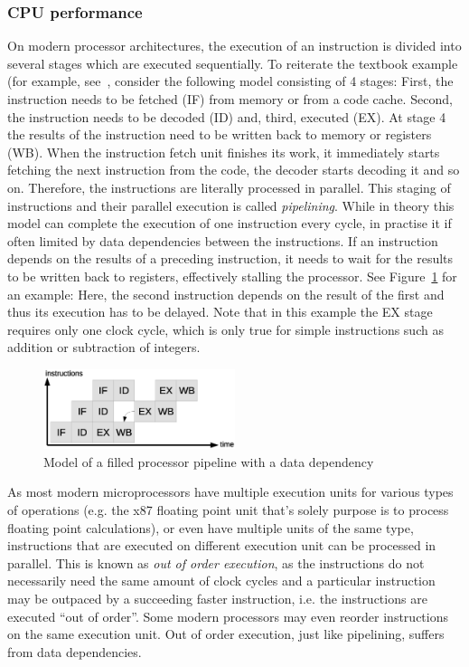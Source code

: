 \subsubsection{CPU performance}
On modern processor architectures, the execution of an instruction is divided into several stages which are executed sequentially. To reiterate the textbook example (for example, see~\cite[p. 411]{murdocca1999computer}, consider the following model consisting of 4 stages: First, the instruction needs to be fetched (IF) from memory or from a code cache. Second, the instruction needs to be decoded (ID) and, third, executed (EX). At stage 4 the results of the instruction need to be written back to memory or registers (WB). When the instruction fetch unit finishes its work, it immediately starts fetching the next instruction from the code, the decoder starts decoding it and so on. Therefore, the instructions are literally processed in parallel. This staging of instructions and their parallel execution is called \emph{pipelining}. While in theory this model can complete the execution of one instruction every cycle, in practise it if often limited by data dependencies between the instructions. If an instruction depends on the results of a preceding instruction, it needs to wait for the results to be written back to registers, effectively stalling the processor. See Figure~\ref{fig:pipeline} for an example: Here, the second instruction depends on the result of the first and thus its execution has to be delayed. Note that in this example the EX stage requires only one clock cycle, which is only true for simple instructions such as addition or subtraction of integers.

\begin{figure}[h]
\begin{center}
\includegraphics[width=0.5\textwidth]{img/pipeline}
\end{center}
\caption{Model of a filled processor pipeline with a data dependency}
\label{fig:pipeline}
\end{figure}

As most modern microprocessors have multiple execution units for various types of operations (e.g. the x87 floating point unit that's solely purpose is to process floating point calculations), or even have multiple units of the same type, instructions that are executed on different execution unit can be processed in parallel. This is known as \emph{out of order execution}, as the instructions do not necessarily need the same amount of clock cycles and a particular instruction may be outpaced by a succeeding faster instruction, i.e. the instructions are executed ``out of order''. Some modern processors may even reorder instructions on the same execution unit. Out of order execution, just like pipelining, suffers from data dependencies.

